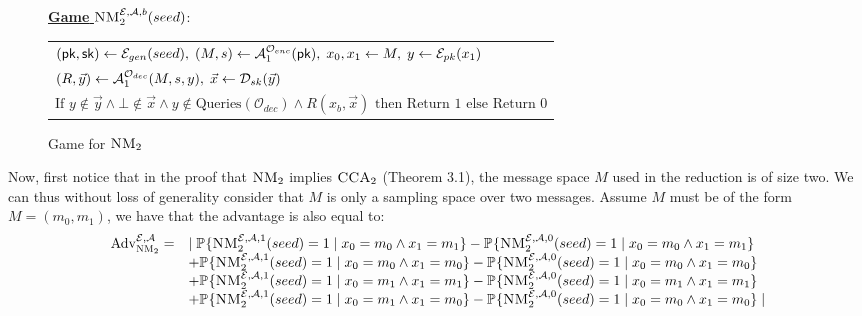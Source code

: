 \begin{figure}[h!]
  \vspace{-1em}
  \centering

        \underline{\textbf{Game}
        $\textsc{NM}_2^{\mathcal{E},\mathcal{A},b}(seed)$}: \\
        \begin{tabular}{l}
          $(\textsf{pk},\textsf{sk}) \leftarrow \mathcal{E}_{gen}(seed),\; (M,s) \leftarrow \mathcal{A}_1^{\mathcal{O}_{enc}}(\textsf{pk}),\; x_0,x_1 \leftarrow M, \; y\leftarrow \mathcal{E}_{pk}(x_1)$\\
          $(R,\vec{y}) \leftarrow \mathcal{A}_1^{\mathcal{O}_{dec}}(M,s,y),\; \vec{x} \leftarrow \mathcal{D}_{sk}(\vec{y})$ \\
$\text{If } y \notin \vec{y} \wedge \bot \notin \vec{x} \wedge y \notin \text{Queries}(\mathcal{O}_{dec}) \wedge R(x_b,\vec{x}) \text{ then Return } 1 \text{ else Return } 0$

        \end{tabular}
  \caption{Game for $\textsc{NM}_2$}
  \label{fig:nm}
\end{figure}



Now, first notice that in the proof that $\textsc{NM}_2$ implies $\textsc{CCA}_2$ (Theorem 3.1), the message space $M$ used in the reduction is of size two. We can thus without loss of generality consider that $M$ is only a sampling space over two messages.
Assume $M$ must be of the form $M=(m_0,m_1)$, we have that the advantage is also equal to:
\[
  \begin{array}{rl}
    \operatorname{Adv}^{\mathcal{E},\mathcal{A}}_{\textsc{NM}_2} = & \mid \mathbb{P}_{}\{\textsc{NM}_2^{\mathcal{E},\mathcal{A},1}(seed) = 1 \mid x_0 = m_0 \wedge x_1 = m_1\} -  \mathbb{P}_{}\{\textsc{NM}_2^{\mathcal{E},\mathcal{A},0}(seed) = 1  \mid x_0 = m_0 \wedge x_1 = m_1\}  \\
                                  & + \mathbb{P}_{}\{\textsc{NM}_2^{\mathcal{E},\mathcal{A},1}(seed) = 1 \mid x_0 = m_0 \wedge x_1 = m_0\} -  \mathbb{P}_{}\{\textsc{NM}_2^{\mathcal{E},\mathcal{A},0}(seed) = 1  \mid x_0 = m_0 \wedge x_1 = m_0\}  \\
                                  & + \mathbb{P}_{}\{\textsc{NM}_2^{\mathcal{E},\mathcal{A},1}(seed) = 1 \mid x_0 = m_1 \wedge x_1 = m_1\} -  \mathbb{P}_{}\{\textsc{NM}_2^{\mathcal{E},\mathcal{A},0}(seed) = 1  \mid x_0 = m_1 \wedge x_1 = m_1\}  \\
     & + \mathbb{P}_{}\{\textsc{NM}_2^{\mathcal{E},\mathcal{A},1}(seed) = 1 \mid x_0 = m_1 \wedge x_1 = m_0\} -  \mathbb{P}_{}\{\textsc{NM}_2^{\mathcal{E},\mathcal{A},0}(seed) = 1  \mid x_0 = m_0 \wedge x_1 = m_0\} \mid \\

  \end{array} \]

